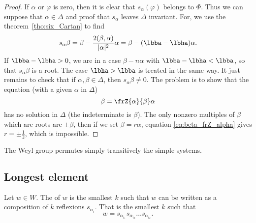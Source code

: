 \begin{proof}
	If $\alpha$ or $\varphi$ is zero, then it is clear that $s_{\alpha}(\varphi)$ belongs to $\Phi$. Thus we can suppose that $\alpha\in\Delta$ and proof that $s_{\alpha}$ leaves $\Delta$ invariant. For, we use the theorem~\ref{tho:six_Cartan} to find
	\begin{equation}
		s_{\alpha}\beta=\beta-\frac{2(\beta,\alpha)}{|\alpha|^2}\alpha
		=\beta-(\lbba-\lbha)\alpha.
	\end{equation}
	If $\lbba-\lbha>0$, we are in a case $\beta-n\alpha$ with $\lbba-\lbha<\lbba$, so that $s_{\alpha}\beta$ is a root. The case $\lbha>\lbba$ is treated in the same way. It just remains to check that  if $\alpha,\beta\in\Delta$, then $s_{\alpha}\beta\neq0$. The problem is to show that the equation (with a given $\alpha$ in $\Delta$)
	\begin{equation}\label{eq:beta_frZ_alpha}
		\beta=\frZ{\alpha}{\beta}\alpha
	\end{equation}
	has no solution in $\Delta$ (the indeterminate is $\beta$). The only nonzero multiples of $\beta$ which are roots are $\pm\beta$, then if we set $\beta=r\alpha$, equation \eqref{eq:beta_frZ_alpha} gives $r=\pm\frac{1}{2}$, which is impossible.

\end{proof}

\begin{proposition}
	The Weyl group permutes simply transitively the simple systems.
\end{proposition}



\subsection{Longest element}

Let \( w\in W\). The  of \( w\) is the smallest \( k\) such that \( w\) can be written as a composition of \( k\) reflexions \( s_{\alpha_i}\). That is the smallest \( k\) such that
\begin{equation}
	w=s_{\alpha_{i_1}}s_{\alpha_{i_2}}\ldots s_{\alpha_{i_k}}.
\end{equation}

